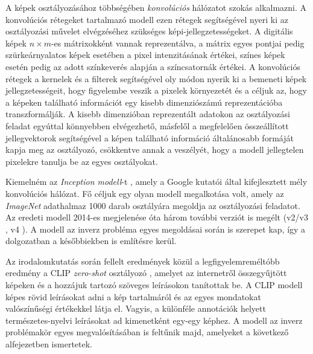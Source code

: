 A képek osztályozásához többségében \textit{konvolúciós} hálózatot szokás alkalmazni. A konvolúciós rétegeket tartalmazó modell ezen rétegek segítségével nyeri ki az osztályozási művelet elvégzéséhez szükséges képi-jellegzetességeket. A digitális képek $n \times m$-es mátrixokként vannak reprezentálva, a mátrix egyes pontjai pedig szürkeárnyalatos képek esetében a pixel intenzitásának értékei, színes képek esetén pedig az adott színkeverés alapján a színcsatornák értékei. A konvolúciós rétegek a kernelek és a filterek segítségével oly módon nyerik ki a bemeneti képek jellegzetességeit, hogy figyelembe veszik a pixelek környezetét és a céljuk az, hogy a képeken található információt egy kisebb dimenziószámú reprezentációba transzformálják. A kisebb dimenzióban reprezentált adatokon az osztályozási feladat egyúttal könnyebben elvégezhető, másfelől a megfelelően összeállított jellegvektorok segítségével a képen található információ általánosabb formáját kapja meg az osztályozó, csökkentve annak a veszélyét, hogy a modell jellegtelen pixelekre tanulja be az egyes osztályokat.

Kiemelném az \textit{Inception modell}-t \cite{szegedy2015going}, amely a Google kutatói által kifejlesztett mély konvolúciós hálózat. Fő céljuk egy olyan modell megalkotása volt, amely az \textit{ImageNet} adathalmaz \cite{deng2009imagenet} 1000 darab osztályára megoldja az osztályozási feladatot. Az eredeti modell 2014-es megjelenése óta három további verziót is megélt (v2/v3 \cite{szegedy2016rethinking}, v4 \cite{szegedy2017inception}). A modell az inverz probléma egyes megoldásai során is szerepet kap, így a dolgozatban a későbbiekben is említésre kerül.

Az irodalomkutatás során fellelt eredmények közül a legfigyelemreméltóbb eredmény a CLIP \textit{zero-shot} osztályozó \cite{radford2021learning}, amelyet az internetről összegyűjtött képeken és a hozzájuk tartozó szöveges leírásokon tanítottak be. A CLIP modell képes rövid leírásokat adni a kép tartalmáról és az egyes mondatokat valószínűségi értékekkel látja el. Vagyis, a különféle annotációk helyett természetes-nyelvi leírásokat ad kimenetként egy-egy képhez. A modell az inverz problémakör egyes megvalósításában is feltűnik majd, amelyeket a következő alfejezetben ismertetek.



